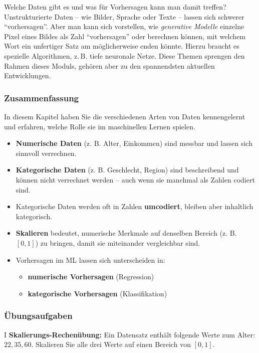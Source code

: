 \begin{lpu}{Welche Daten gibt es und was für Vorhersagen kann man damit treffen?}
Unstrukturierte Daten – wie Bilder, Sprache oder Texte – lassen sich schwerer ``vorhersagen''. Aber man kann sich vorstellen, wie \textit{generative Modelle} einzelne Pixel eines Bildes als Zahl ``vorhersagen'' oder berechnen können, mit welchem Wort ein unfertiger Satz am möglicherweise enden könnte. Hierzu braucht es spezielle Algorithmen, z.\,B. tiefe neuronale Netze. Diese Themen sprengen den Rahmen dieses Moduls, gehören aber zu den spannendsten aktuellen Entwicklungen.

\subsubsection*{Zusammenfassung}

In diesem Kapitel haben Sie die verschiedenen Arten von Daten kennengelernt und erfahren, welche Rolle sie im maschinellen Lernen spielen.  

\begin{itemize}
  \item \textbf{Numerische Daten} (z. B. Alter, Einkommen) sind messbar und lassen sich sinnvoll verrechnen.
  \item \textbf{Kategorische Daten} (z. B. Geschlecht, Region) sind beschreibend und können nicht verrechnet werden – auch wenn sie manchmal als Zahlen codiert sind.
  \item Kategorische Daten werden oft in Zahlen \textbf{umcodiert}, bleiben aber inhaltlich kategorisch.
  \item \textbf{Skalieren} bedeutet, numerische Merkmale auf denselben Bereich (z. B. $[0,1]$) zu bringen, damit sie miteinander vergleichbar sind.
  \item Vorhersagen im ML lassen sich unterscheiden in:
  \begin{itemize}
    \item \textbf{numerische Vorhersagen} (Regression)
    \item \textbf{kategorische Vorhersagen} (Klassifikation)
  \end{itemize}
\end{itemize}

\subsubsection*{Übungsaufgaben}

\begin{aufgabe}{I}
\textbf{Skalierungs-Rechenübung:}  Ein Datensatz enthält folgende Werte zum Alter: $22, 35, 60$. Skalieren Sie alle drei Werte auf einen Bereich von $[0, 1]$.  
\end{aufgabe}


\end{lpu}
